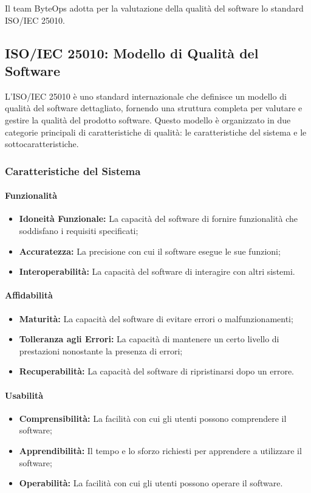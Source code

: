 Il team ByteOps adotta per la valutazione della qualità del software lo standard ISO/IEC 25010.
\subsection{ISO/IEC 25010: Modello di Qualità del Software}

L'ISO/IEC 25010 è uno standard internazionale che definisce un modello di qualità del software dettagliato, fornendo una struttura completa per valutare e gestire la qualità del prodotto software. Questo modello è organizzato in due categorie principali di caratteristiche di qualità: le caratteristiche del sistema e le sottocaratteristiche.

\subsubsection{Caratteristiche del Sistema}

\paragraph{Funzionalità}
\begin{itemize}
    \item \textbf{Idoneità Funzionale:} La capacità del software di fornire funzionalità che soddisfano i requisiti specificati;
    \item \textbf{Accuratezza:} La precisione con cui il software esegue le sue funzioni;
    \item \textbf{Interoperabilità:} La capacità del software di interagire con altri sistemi.
\end{itemize}

\paragraph{Affidabilità}
\begin{itemize}
    \item \textbf{Maturità:} La capacità del software di evitare errori o malfunzionamenti;
    \item \textbf{Tolleranza agli Errori:} La capacità di mantenere un certo livello di prestazioni nonostante la presenza di errori;
    \item \textbf{Recuperabilità:} La capacità del software di ripristinarsi dopo un errore.
\end{itemize}

\paragraph{Usabilità}
\begin{itemize}
    \item \textbf{Comprensibilità:} La facilità con cui gli utenti possono comprendere il software;
    \item \textbf{Apprendibilità:} Il tempo e lo sforzo richiesti per apprendere a utilizzare il software;
    \item \textbf{Operabilità:} La facilità con cui gli utenti possono operare il software.
\end{itemize}

